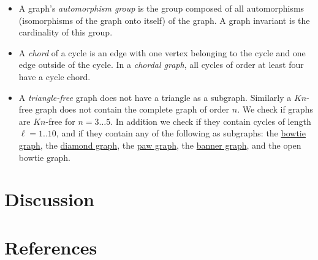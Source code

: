 \documentclass[12pt]{article}
\newcommand{\bowtiegraph}{\href{http://mathworld.wolfram.com/ButterflyGraph.html}{bowtie graph}}
\newcommand{\diamondgraph}{\href{http://mathworld.wolfram.com/DiamondGraph.html}{diamond graph}}
\newcommand{\pawgraph}{\href{http://mathworld.wolfram.com/PawGraph.html}{paw graph}}
\newcommand{\bannergraph}{\href{http://mathworld.wolfram.com/BannerGraph.html}{banner graph}}
\begin{document}
\begin{itemize}
\item A graph's \textit{automorphism group} is the group composed of all automorphisms (isomorphisms of the graph onto itself) of the graph. A graph invariant is the cardinality of this group. 

\item A \textit{chord} of a cycle is an edge with one vertex belonging to the cycle and one edge outside of the cycle. In a \textit{chordal graph}, all cycles of order at least four have a cycle chord.   

\item A \textit{triangle-free} graph does not have a triangle as a subgraph. Similarly a $Kn$-free graph does not contain the complete graph of order $n$. We check if graphs are $Kn$-free for $n=3\dots 5$. In addition we check if they contain cycles of length $\ell = 1.. 10$, and if they contain any of the following as subgraphs: the \bowtiegraph, the \diamondgraph, the \pawgraph, the \bannergraph, and the open bowtie graph.  



\end{itemize}
\section{Discussion}


\section{References}
\end{document}
